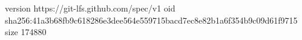 version https://git-lfs.github.com/spec/v1
oid sha256:41a3b68fb9c618286e3dee564e559715bacd7ec8e82b1a6f354b9c09d61f9715
size 174880
